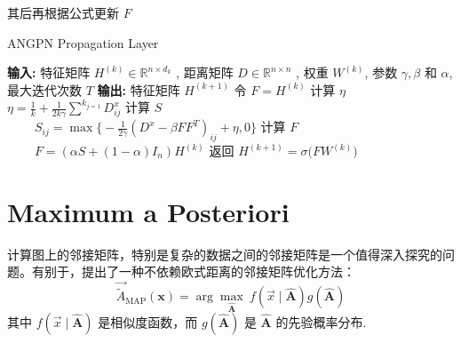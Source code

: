 \documentclass[color=gray,base=hide,cn]{elegantbook}
\begin{document}
其后再根据公式更新 $F$

\begin{algorithm}[h]
\caption{ANGPN Propagation Layer}
\begin{algorithmic}[1]
\STATE \textbf{输入:} 特征矩阵 ${H}^{(k)}\in \mathbb{R}^{n\times d_k}$ , 距离矩阵 $D\in \mathbb{R}^{n\times n}$ , 权重 $W^{(k)}$, 参数 $\gamma, \beta$ 和 $\alpha$,  最大迭代次数 $T$
\STATE \textbf{输出:} 特征矩阵 $H^{(k+1)}$
\STATE 令 $F = H^{(k)}$
\STATE 计算 $\eta$ %
$
\textstyle \eta = \frac{1}{k} +\frac{1}{2k\gamma}\sum^k\nolimits_{j=1} D^x_{ij}
$
\STATE 计算 $S$\\
$
\ \ \ \ \ \ \ \ \ \ S_{ij} = \max\big\{-\frac{1}{2\gamma}(D^x - \beta FF^T)_{ij} + \eta, 0\big\}
$
\STATE 计算 $F$\\
$
\ \ \ \ \ \ \ \ \ \ F = (\alpha S + (1-\alpha) I_n)H^{(k)}%
$
\ENDFOR \label{code:recentEnd}
\STATE 返回
$
H^{(k+1)} =\sigma\big( {F}  {W}^{(k)}\big)
$
\emph{}
\end{algorithmic}
\end{algorithm}

\section{Maximum a Posteriori}
计算图上的邻接矩阵，特别是复杂的数据之间的邻接矩阵是一个值得深入探究的问题。有别于\cite{Jiang2019SemisupervisedLW}，\cite{gao2019exploring}提出了一种不依赖欧式距离的邻接矩阵优化方法：
\begin{equation}
\vec{\tilde{A}}_\text{MAP}(\mathbf{x}) = \arg \max_{\mathbf{\hat{A}}} \ f(\vec{x} \mid \mathbf{\hat{A}})g(\mathbf{\hat{A}})
\end{equation}
其中 $ f(\vec{x} \mid \mathbf{\hat{A}})$ 是相似度函数，而 $g(\mathbf{\hat{A}})$ 是 $\mathbf{\hat{A}}$ 的先验概率分布. 
\end{document}
